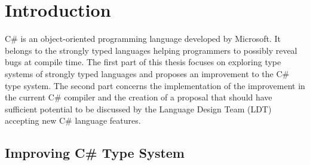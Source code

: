 \chapter{Introduction}

C\# is an object-oriented programming language developed by Microsoft. 
It belongs to the strongly typed languages helping programmers to possibly reveal bugs at compile time. 
The first part of this thesis focuses on exploring type systems of strongly typed languages and proposes an improvement to the C\# type system. 
The second part concerns the implementation of the improvement in the current C\# compiler and the creation of a proposal that should have sufficient potential to be discussed by the Language Design Team (LDT) accepting new C\# language features.

\section{Improving C\# Type System} \label{sect01:imprv}

